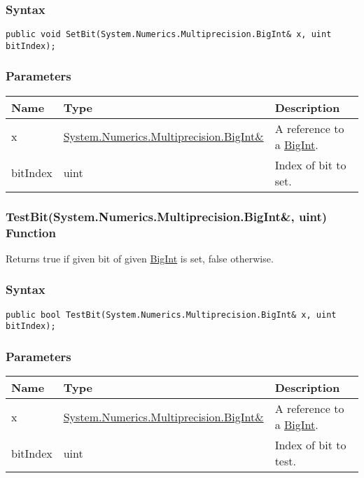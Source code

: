 \documentclass[a4paper,oneside,11.000000pt]{book}
\begin{document}
\subsubsection*{Syntax}
\texttt{public void SetBit(System.Numerics.Multiprecision.BigInt\& x, uint bitIndex);}
\subsubsection*{Parameters}
\begin{flushleft}
\begin{supertabular}[l]{!{\raggedright}p{1.94573cm}!{\raggedright}p{7.92093cm}!{\raggedright}p{4.93333cm}}
\textbf{Name}
& \textbf{Type}
& \textbf{Description}
\\
\hline
x
& \hyperlink{System.Numerics.Multiprecision.BigInt}{System.\-Numerics.\-Multiprecision.\-BigInt\&\-}
& A reference to a \hyperlink{System.Numerics.Multiprecision.BigInt}{BigInt}.

\\
bitIndex
& uint
& Index of bit to set.

\\
\end{supertabular}

\end{flushleft}
\clearpage

\hypertarget{System.Numerics.Multiprecision.TestBit.R.System.Numerics.Multiprecision.BigInt.uint}{\subsubsection*{TestBit(System.Numerics.Multiprecision.BigInt\&, uint) Function}}
\begin{flushleft}
Returns true if given bit of given \hyperlink{System.Numerics.Multiprecision.BigInt}{BigInt} is set, false otherwise.

\end{flushleft}
\subsubsection*{Syntax}
\texttt{public bool TestBit(System.Numerics.Multiprecision.BigInt\& x, uint bitIndex);}
\subsubsection*{Parameters}
\begin{flushleft}
\begin{supertabular}[l]{!{\raggedright}p{1.94573cm}!{\raggedright}p{7.92093cm}!{\raggedright}p{4.93333cm}}
\textbf{Name}
& \textbf{Type}
& \textbf{Description}
\\
\hline
x
& \hyperlink{System.Numerics.Multiprecision.BigInt}{System.\-Numerics.\-Multiprecision.\-BigInt\&\-}
& A reference to a \hyperlink{System.Numerics.Multiprecision.BigInt}{BigInt}.

\\
bitIndex
& uint
& Index of bit to test.

\\
\end{supertabular}

\end{flushleft}
\end{document}
